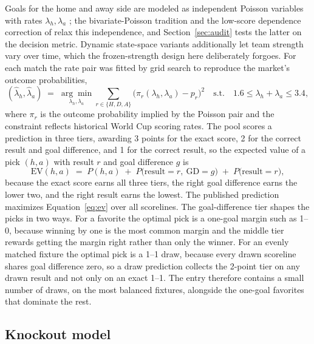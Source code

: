 \documentclass[11pt,letterpaper]{article}
\begin{document}
Goals for the home and away side are modeled as independent Poisson variables with rates $\lambda_h, \lambda_a$ \citep{maher1982}; the bivariate-Poisson tradition \citep{karlis2003} and the low-score dependence correction of \citet{dixoncoles1997} relax this independence, and Section~\ref{sec:audit} tests the latter on the decision metric. Dynamic state-space variants \citep{koopmanlit2015} additionally let team strength vary over time, which the frozen-strength design here deliberately forgoes. For each match the rate pair was fitted by grid search to reproduce the market's outcome probabilities,
\begin{equation}
(\hat\lambda_h, \hat\lambda_a) \;=\; \underset{\lambda_h,\lambda_a}{\arg\min} \sum_{r \in \{H,D,A\}} \bigl(\pi_r(\lambda_h,\lambda_a) - p_r\bigr)^2
\quad \text{s.t.} \quad 1.6 \le \lambda_h + \lambda_a \le 3.4,
\end{equation}
where $\pi_r$ is the outcome probability implied by the Poisson pair and the constraint reflects historical World Cup scoring rates. The pool scores a prediction in three tiers, awarding 3 points for the exact score, 2 for the correct result and goal difference, and 1 for the correct result, so the expected value of a pick $(h,a)$ with result $r$ and goal difference $g$ is
\begin{equation}
\mathrm{EV}(h,a) \;=\; P(h,a) \;+\; P\bigl(\text{result}=r,\ \text{GD}=g\bigr) \;+\; P\bigl(\text{result}=r\bigr),
\label{eq:ev}
\end{equation}
because the exact score earns all three tiers, the right goal difference earns the lower two, and the right result earns the lowest. The published prediction maximizes Equation~\eqref{eq:ev} over all scorelines. The goal-difference tier shapes the picks in two ways. For a favorite the optimal pick is a one-goal margin such as 1--0, because winning by one is the most common margin and the middle tier rewards getting the margin right rather than only the winner. For an evenly matched fixture the optimal pick is a 1--1 draw, because every drawn scoreline shares goal difference zero, so a draw prediction collects the 2-point tier on any drawn result and not only on an exact 1--1. The entry therefore contains a small number of draws, on the most balanced fixtures, alongside the one-goal favorites that dominate the rest.

\subsection{Knockout model}\label{sec:elo}
\end{document}
